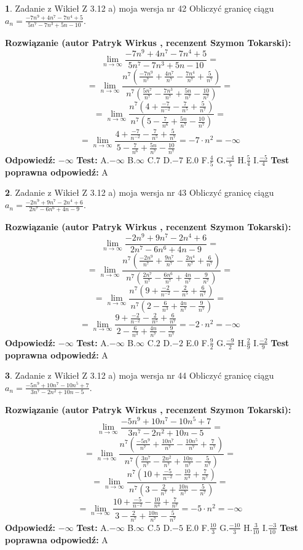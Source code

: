 \documentclass[12pt, a4paper]{article}
\theoremstyle{definition} %
\newtheorem{zad}{}
\newcommand{\zadStart}[1]{\begin{zad}#1\newline}
\newcommand{\zadStop}{\end{zad}}
\newcommand{\rozwStart}[2]{\noindent \textbf{Rozwiązanie (autor #1 , recenzent #2): }\newline}
\newcommand{\rozwStop}{\newline}
\newcommand{\odpStart}{\noindent \textbf{Odpowiedź:}\newline}
\newcommand{\odpStop}{\newline}
\newcommand{\testStart}{\noindent \textbf{Test:}\newline}
\newcommand{\testStop}{\newline}
\newcommand{\kluczStart}{\noindent \textbf{Test poprawna odpowiedź:}\newline}
\newcommand{\kluczStop}{\newline}
\begin{document}
\zadStart{Zadanie z Wikieł Z 3.12 a) moja wersja nr 42}
Obliczyć granicę ciągu $a_{n}=\frac{-7n^{9}+4n^{7}-7n^{4}+5}{5n^{7}-7n^{3}+5n-10}$.
\zadStop
\rozwStart{Patryk Wirkus}{Szymon Tokarski}
$$\lim\limits_{n\to\infty}\frac{-7n^{9}+4n^{7}-7n^{4}+5}{5n^{7}-7n^{3}+5n-10}=$$
$$=\lim\limits_{n\to\infty}\frac{n^{7}\left(\frac{-7n^{9}}{n^{7}}+\frac{4n^{7}}{n^{7}}-\frac{7n^{4}}{n^{7}}+\frac{5}{n^{7}}\right)}{n^{7}\left(\frac{5n^{7}}{n^{7}}-\frac{7n^{3}}{n^{7}}+\frac{5n}{n^{7}}-\frac{10}{n^{7}}\right)}=$$
$$=\lim\limits_{n\to\infty}\frac{n^{7}\left(4+\frac{-7}{n^{-2}}-\frac{7}{n^{5}}+\frac{5}{n^{7}}\right)}
{n^{7}\left(5-\frac{7}{n^{6}}+\frac{5n}{n^{7}}-\frac{10}{n^{7}}\right)}=$$
$$=\lim\limits_{n\to\infty}\frac{4+\frac{-7}{n^{-2}}-\frac{7}{n^{5}}+\frac{5}{n^{7}}}{5-\frac{7}{n^{6}}+\frac{5n}{n^{7}}-\frac{10}{n^{7}}}=-7\cdot n^{2} = -\infty$$
\rozwStop
\odpStart
$-\infty$
\odpStop
\testStart
A.$-\infty$
B.$\infty$
C.$7$
D.$-7$
E.$0$
F.$\frac{4}{5}$
G.$\frac{-4}{5}$
H.$\frac{5}{4}$
I.$\frac{-5}{4}$
\testStop
\kluczStart
A
\kluczStop



\zadStart{Zadanie z Wikieł Z 3.12 a) moja wersja nr 43}
Obliczyć granicę ciągu $a_{n}=\frac{-2n^{9}+9n^{7}-2n^{4}+6}{2n^{7}-6n^{6}+4n-9}$.
\zadStop
\rozwStart{Patryk Wirkus}{Szymon Tokarski}
$$\lim\limits_{n\to\infty}\frac{-2n^{9}+9n^{7}-2n^{4}+6}{2n^{7}-6n^{6}+4n-9}=$$
$$=\lim\limits_{n\to\infty}\frac{n^{7}\left(\frac{-2n^{9}}{n^{7}}+\frac{9n^{7}}{n^{7}}-\frac{2n^{4}}{n^{7}}+\frac{6}{n^{7}}\right)}{n^{7}\left(\frac{2n^{7}}{n^{7}}-\frac{6n^{6}}{n^{7}}+\frac{4n}{n^{7}}-\frac{9}{n^{7}}\right)}=$$
$$=\lim\limits_{n\to\infty}\frac{n^{7}\left(9+\frac{-2}{n^{-2}}-\frac{2}{n^{5}}+\frac{6}{n^{7}}\right)}
{n^{7}\left(2-\frac{6}{n^{3}}+\frac{4n}{n^{7}}-\frac{9}{n^{7}}\right)}=$$
$$=\lim\limits_{n\to\infty}\frac{9+\frac{-2}{n^{-2}}-\frac{2}{n^{5}}+\frac{6}{n^{7}}}{2-\frac{6}{n^{3}}+\frac{4n}{n^{7}}-\frac{9}{n^{7}}}=-2\cdot n^{2} = -\infty$$
\rozwStop
\odpStart
$-\infty$
\odpStop
\testStart
A.$-\infty$
B.$\infty$
C.$2$
D.$-2$
E.$0$
F.$\frac{9}{2}$
G.$\frac{-9}{2}$
H.$\frac{2}{9}$
I.$\frac{-2}{9}$
\testStop
\kluczStart
A
\kluczStop



\zadStart{Zadanie z Wikieł Z 3.12 a) moja wersja nr 44}
Obliczyć granicę ciągu $a_{n}=\frac{-5n^{9}+10n^{7}-10n^{5}+7}{3n^{7}-2n^{2}+10n-5}$.
\zadStop
\rozwStart{Patryk Wirkus}{Szymon Tokarski}
$$\lim\limits_{n\to\infty}\frac{-5n^{9}+10n^{7}-10n^{5}+7}{3n^{7}-2n^{2}+10n-5}=$$
$$=\lim\limits_{n\to\infty}\frac{n^{7}\left(\frac{-5n^{9}}{n^{7}}+\frac{10n^{7}}{n^{7}}-\frac{10n^{5}}{n^{7}}+\frac{7}{n^{7}}\right)}{n^{7}\left(\frac{3n^{7}}{n^{7}}-\frac{2n^{2}}{n^{7}}+\frac{10n}{n^{7}}-\frac{5}{n^{7}}\right)}=$$
$$=\lim\limits_{n\to\infty}\frac{n^{7}\left(10+\frac{-5}{n^{-2}}-\frac{10}{n^{4}}+\frac{7}{n^{7}}\right)}
{n^{7}\left(3-\frac{2}{n^{7}}+\frac{10n}{n^{7}}-\frac{5}{n^{7}}\right)}=$$
$$=\lim\limits_{n\to\infty}\frac{10+\frac{-5}{n^{-2}}-\frac{10}{n^{4}}+\frac{7}{n^{7}}}{3-\frac{2}{n^{7}}+\frac{10n}{n^{7}}-\frac{5}{n^{7}}}=-5\cdot n^{2} = -\infty$$
\rozwStop
\odpStart
$-\infty$
\odpStop
\testStart
A.$-\infty$
B.$\infty$
C.$5$
D.$-5$
E.$0$
F.$\frac{10}{3}$
G.$\frac{-10}{3}$
H.$\frac{3}{10}$
I.$\frac{-3}{10}$
\testStop
\kluczStart
A
\kluczStop
\end{document}
